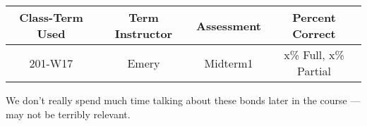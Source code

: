 
\begin{outcomes}
	\begin{center}
		\begin{tabular}{cccc}
			\hline\hline
			Class-Term Used & Term Instructor & Assessment & Percent Correct\\
			\hline
			 201-W17 & Emery & Midterm1 & x\% Full, x\% Partial\\    %
			\hline
		\end{tabular}
	\end{center}
\end{outcomes}

\begin{comments}

We don't really spend much time talking about these bonds later in the course --- may not be terribly relevant.
	
\end{comments}